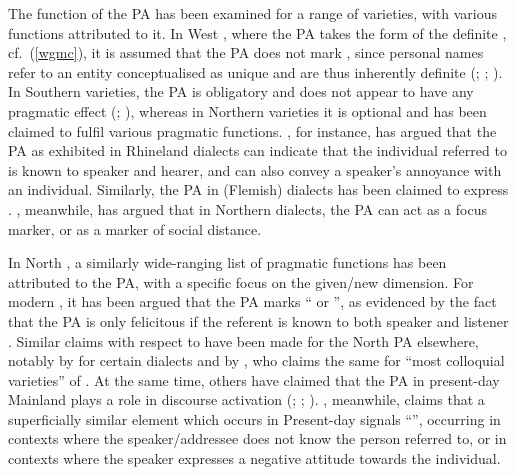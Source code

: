 \documentclass[output=paper,colorlinks,citecolor=brown]{langscibook}
\begin{document}
The function of the PA has been examined for a range of  varieties, with various functions attributed to it. In West , where the PA takes the form of the definite , cf.~(\ref{wgmc}), it is assumed that the PA does not mark , since personal names refer to an entity conceptualised as unique and are thus inherently definite  (\citealp{longobardi1994reference}; \citealp{nubling2017growing, nubling2020capital}; \citealp{schmuck2020rise}). 
In Southern  varieties, the PA is obligatory and does not appear to have any pragmatic effect (\citealp{nubling2020capital}; \citealp{schmuck2020grammaticalisation}), whereas in Northern  varieties it is optional and has been claimed to fulfil various pragmatic functions. \citet{hartmann1982deixis}, for instance, has argued that the PA as exhibited in Rhineland dialects can indicate that the individual referred to is known to speaker and hearer, and can also convey a speaker's annoyance with an individual. Similarly, the PA in (Flemish)  dialects has been claimed to express   \citep[158]{Langendonck2007theory}. \citet{werth2014funktionen}, meanwhile, has argued that in Northern  dialects, the PA can act as a focus marker, or as a marker of social distance. 

In North , a similarly wide-ranging list of pragmatic functions has been attributed to the PA, with a specific focus on the given/new dimension. For modern , it has been argued that the PA marks `` or '', as evidenced by the fact that the PA is only felicitous if the referent is known to both speaker and listener \citep[220]{Sigurdsson2006}. Similar claims with respect to  have been made for the North  PA elsewhere, notably by \citet{Haberg2010} for certain  dialects and by \citet[97]{dahl2015grammaticalization}, who claims the same for ``most colloquial varieties'' of . At the same time, others have claimed that the PA in present-day Mainland  plays a role in discourse activation (\citealp{Teleman1999}; \citealp{Strahan2007}; \citealp{Lie2008,lie2010om}).
\citet{Johannessen2008,johannessen2020psychologically}, meanwhile, claims that a superficially similar element which occurs in Present-day  signals ``'', occurring in contexts where the speaker/addressee does not know the person referred to, or in contexts where the speaker expresses a negative attitude towards the individual.
\end{document}
